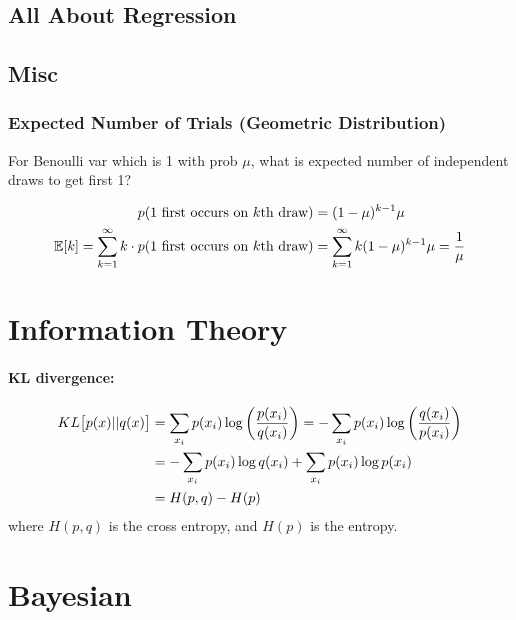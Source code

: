 \documentclass[11pt]{article}
\begin{document}
\subsection{All About Regression}


\subsection{Misc}

\subsubsection{Expected Number of Trials (Geometric Distribution)}
For Benoulli var which is 1 with prob $\mu$, what is expected number of independent draws
to get first 1?

\begin{align}
  p(\textrm{1 first occurs on $k$th draw}) &= (1-\mu)^{k-1} \mu \nonumber\\
  \mathbb{E}[k] = \sum_{k=1}^{\infty} k \cdot p(\textrm{1 first occurs on $k$th draw}) &=
          \sum_{k=1}^{\infty} k (1-\mu)^{k-1} \mu = \frac{1}{\mu}
\end{align}




\section{Information Theory}
\paragraph{KL divergence:}
\begin{align}
  KL\big[p(x) || q(x)\big]
  &= \sum_{x_i} p(x_i) \log \left( \frac{p(x_i)}{q(x_i)} \right)
    = -\sum_{x_i} p(x_i) \log \left( \frac{q(x_i)}{p(x_i)} \right) \nonumber\\ 
  &= -\sum_{x_i} p(x_i) \log q(x_i) + \sum_{x_i} p(x_i) \log p(x_i) \nonumber\\ 
  &= H(p,q) - H(p)
\end{align}
where $H(p,q)$ is the cross entropy, and $H(p)$ is the entropy.



\section{Bayesian}
\end{document}
